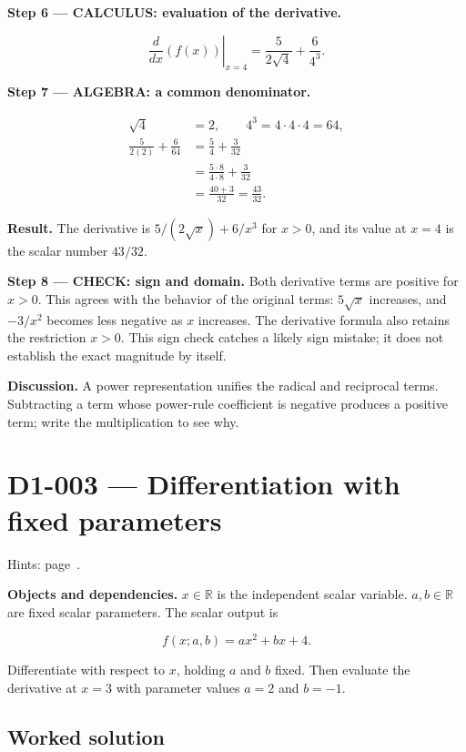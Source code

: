 \documentclass[11pt,oneside,openany]{book}
\begin{document}
\endgroup
\textbf{Step 6 --- CALCULUS: evaluation of the derivative.}

\[
\left.\frac{d}{dx}\left(f(x)\right)\right|_{x=4}
=\frac{5}{2\sqrt{4}}+\frac{6}{4^3}.
\]

\begingroup\color{AlgebraBlue}
\textbf{Step 7 --- ALGEBRA: a common denominator.}

\[
\begin{aligned}
\sqrt4&=2,\qquad 4^3=4\cdot4\cdot4=64,\\
\frac{5}{2(2)}+\frac6{64}
&=\frac54+\frac3{32}\\
&=\frac{5\cdot8}{4\cdot8}+\frac3{32}\\
&=\frac{40+3}{32}=\frac{43}{32}.
\end{aligned}
\]

\endgroup
\textbf{Result.} The derivative is \(5/(2\sqrt{x})+6/x^3\) for \(x>0\), and its value at
\(x=4\) is the scalar number \(43/32\).

\textbf{Step 8 --- CHECK: sign and domain.} Both derivative terms are positive for
\(x>0\). This agrees with the behavior of the original terms: \(5\sqrt{x}\) increases,
and \(-3/x^2\) becomes less negative as \(x\) increases. The derivative formula also
retains the restriction \(x>0\). This sign check catches a likely sign mistake; it
does not establish the exact magnitude by itself.

\textbf{Discussion.} A power representation unifies the radical and reciprocal terms.
Subtracting a term whose power-rule coefficient is negative produces a positive
term; write the multiplication to see why.
\clearpage
\section{D1-003 --- Differentiation with fixed parameters}
\label{problem:D1-003}
{\small Hints: page~\pageref{hints:D1-003}.}\par\medskip

\textbf{Objects and dependencies.} \(x\in\mathbb R\) is the independent scalar variable.
\(a,b\in\mathbb R\) are fixed scalar parameters. The scalar output is

\[
f(x;a,b)=ax^2+bx+4.
\]

Differentiate with respect to \(x\), holding \(a\) and \(b\) fixed. Then evaluate the
derivative at \(x=3\) with parameter values \(a=2\) and \(b=-1\).
\subsection*{Worked solution}
\end{document}
